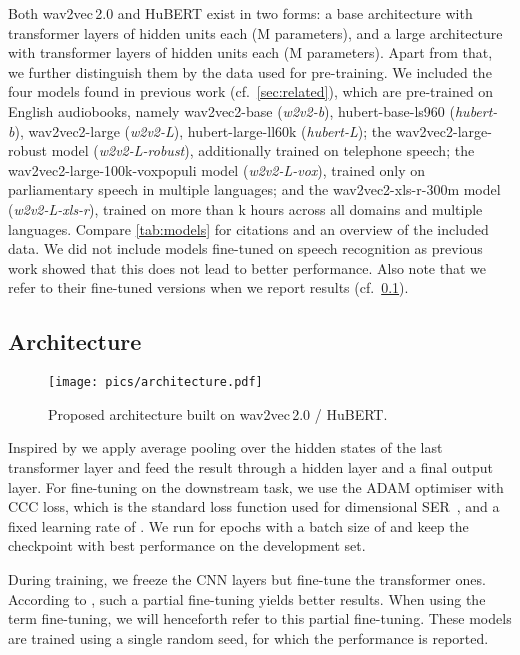 \documentclass{article}
\newcommand\wbase{\mbox{\emph{w2v2-b}}}
\newcommand\hbase{\mbox{\emph{hubert-b}}}
\newcommand\wlarge{\mbox{\emph{w2v2-L}}}
\newcommand\hlarge{\mbox{\emph{hubert-L}}}
\newcommand\wrobust{\mbox{\emph{w2v2-L-robust}}}
\newcommand\wvox{\mbox{\emph{w2v2-L-vox}}}
\newcommand\wxlsr{\mbox{\emph{w2v2-L-xls-r}}}
\newcommand{\wtov}{wav2vec\,2.0}
\newcommand{\hubert}{HuBERT}
\newcommand{\cf}{{cf.\ }}
\begin{document}
Both {\wtov} and {\hubert} exist in two forms:
a base architecture with  transformer layers of  hidden units each (M parameters),
and a large architecture with  transformer layers of  hidden units each (M parameters). 
Apart from that, we further distinguish them by the data used for pre-training.
We included the four models found in previous work (\cf \cref{sec:related}),
which are pre-trained on English audiobooks,
namely
wav2vec2-base (\wbase),
hubert-base-ls960 (\hbase),
wav2vec2-large (\wlarge),
hubert-large-ll60k (\hlarge);
the wav2vec2-large-robust model (\wrobust),
additionally trained on telephone speech;
the wav2vec2-large-100k-voxpopuli model (\wvox),
trained only on parliamentary speech in multiple languages;
and the wav2vec2-xls-r-300m model (\wxlsr),
trained on more than k hours across all domains and multiple languages.
Compare \cref{tab:models} for citations and an overview of the included data.
We did not include models fine-tuned on speech recognition
as previous work showed that this does not lead to better performance.
Also note that we refer to their fine-tuned versions when we report results (\cf \cref{subsec:architecture}).





\subsection{Architecture}
\label{subsec:architecture}

\begin{figure}[t]
    \centering
    \texttt{[image: pics/architecture.pdf]}
    \caption{Proposed architecture built on {\wtov} / {\hubert}.}
    \label{fig:architecture}
\end{figure}

Inspired by \citet{wang2021finetuned}
we apply average pooling over the hidden states of the last transformer layer
and feed the result through a hidden layer and a final output layer. For fine-tuning on the downstream task,
we use the ADAM optimiser with \ac{CCC} loss,
which is the standard loss function
used for dimensional \ac{SER}~\citep{Trigeorgis16-AFE, li2021contrastive, triantafyllopoulos2021multistage},
and a fixed learning rate of .
We run for  epochs with a batch size of 
and keep the checkpoint with best performance on the development set. 

During training,
we freeze the CNN layers but fine-tune the transformer ones. 
According to \citet{wang2021finetuned},
such a partial fine-tuning yields better results.
When using the term fine-tuning,
we will henceforth refer to this partial fine-tuning.
These models are trained using a single random seed,
for which the performance is reported. 
\end{document}
